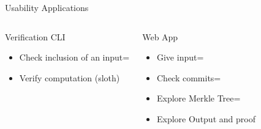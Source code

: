\begin{frame}[t]{Usability Applications}
    \begin{columns}[T,onlytextwidth]

        \begin{block}{Verification CLI}
            \small
            \vspace{-.5em}
            \begin{itemize}
                \item Check inclusion of an input\itemsep=\smallerspacing
                \item Verify computation (sloth)
            \end{itemize}
            \vspace{-.5em}
        \end{block}


        \pause


        \begin{block}{Web App}
            \small
            \vspace{-.5em}
            \begin{itemize}
                \item Give input\itemsep=\smallerspacing
                \item Check commits\itemsep=\smallerspacing
                \item Explore Merkle Tree\itemsep=\smallerspacing
                \item Explore Output and proof
            \end{itemize}
            \vspace{-.5em}
        \end{block}


\end{columns}
\end{frame}
